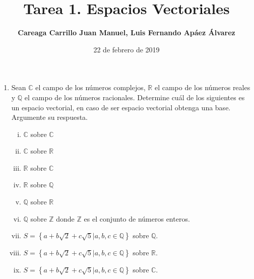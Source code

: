 \documentclass{article}
\begin{document}
    \title{Tarea 1. Espacios Vectoriales}
    \author{\bf Careaga Carrillo Juan Manuel, Luis Fernando Apáez Álvarez}
    \date{22 de febrero de 2019}
    \maketitle
    
    \begin{enumerate}
        \item Sean $\mathbb{C}$ el campo de los números complejos, $\mathbb{R}$
        el campo de los números reales y $\mathbb{Q}$ el campo de los números
        racionales. Determine cuál de los siguientes es un espacio vectorial,
        en caso de ser espacio vectorial obtenga una base. Argumente su
        respuesta.
        \begin{enumerate}[i.]
            \item {
                $\mathbb{C}$ sobre $\mathbb{C}$
            }
            \item {
                $\mathbb{C}$ sobre $\mathbb{R}$
            }
            \item {
                $\mathbb{R}$ sobre $\mathbb{C}$
            }
            \item {
                $\mathbb{R}$ sobre $\mathbb{Q}$
            }
            \item {
                $\mathbb{Q}$ sobre $\mathbb{R}$
            }
            \item {
                $\mathbb{Q}$ sobre $\mathbb{Z}$ donde $\mathbb{Z}$ es el conjunto de números enteros.
            }
            \item {
                $S=\left\{a+b\sqrt{2}+c\sqrt{5}\big\vert a,b,c\in\mathbb{Q}\right\}$ sobre $\mathbb{Q}$.
            }
            \item {
                $S=\left\{a+b\sqrt{2}+c\sqrt{5}\big\vert a,b,c\in\mathbb{Q}\right\}$ sobre $\mathbb{R}$.
            }
            \item {
                $S=\left\{a+b\sqrt{2}+c\sqrt{5}\big\vert a,b,c\in\mathbb{Q}\right\}$ sobre $\mathbb{C}$.
            }
        \end{enumerate}


\end{enumerate}
\end{document}
